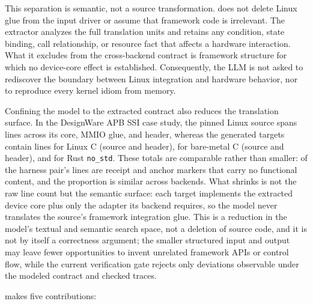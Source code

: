 This separation is semantic, not a source transformation. \reharness{} does not delete Linux glue from the input driver or assume that framework code is irrelevant. The extractor analyzes the full translation units and retains any condition, state binding, call relationship, or resource fact that affects a hardware interaction. What it excludes from the cross-backend contract is framework structure for which no device-core effect is established. Consequently, the LLM is not asked to rediscover the boundary between Linux integration and hardware behavior, nor to reproduce every kernel idiom from memory.

Confining the model to the extracted contract also reduces the translation
surface. In the DesignWare APB SSI case study, the pinned Linux source spans
\DwSourceLines{} lines across its core, MMIO glue, and header, whereas the
generated targets contain \DwLinuxLines{} lines for Linux C (source and
header), \DwBaremetalLines{} for bare-metal C (source and header), and
\DwRustLines{} for Rust \texttt{no\_std}. These totals are comparable
rather than smaller: \DwReceiptMarkerLines{} of the harness pair's lines
are receipt and anchor markers that carry no functional content, and the
proportion is similar across backends. What shrinks is not the raw line
count but the semantic surface: each target implements the extracted
device core plus only the adapter its backend requires, so the model never
translates the source's framework integration glue. This is a reduction in
the model's textual and semantic search space, not a deletion of source
code, and it is not by itself a correctness argument; the smaller
structured input and output may leave fewer opportunities to invent
unrelated framework APIs or control flow, while the current verification
gate rejects only deviations observable under the modeled contract and
checked traces.

\reharness{} makes five contributions:

